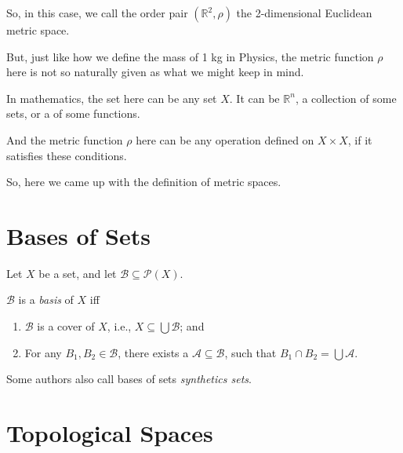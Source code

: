 \documentclass{report}
\begin{document}
So, in this case, we call the order pair $(\mathbb R^2, \rho)$ the 2-dimensional Euclidean metric space.

But, just like how we define the mass of 1 kg in Physics, the metric function $\rho$ here is not so naturally given as what we might keep in mind.

In mathematics, the set here can be any set $X$. It can be $\mathbb R^n$, a collection of some sets, or a of some functions.

And the metric function $\rho$ here can be any operation defined on $X \times X$, if it satisfies these conditions.

So, here we came up with the definition of metric spaces.


\begin{definition}
	
\end{definition}





\section{Bases of Sets}


\begin{definition}
	\label{def: bases of sets}
	Let $X$ be a set, and let $\mathcal B \subseteq \mathcal P(X)$.
	
	$\mathcal B$ is a \textit{basis} of $X$ iff
	\begin{enumerate}
		\item 
		$\mathcal B$ is a cover of $X$, i.e., $X \subseteq \bigcup \mathcal B$; and
		
		\item
		For any $B_1, B_2 \in \mathcal B$, there exists a $\mathcal A \subseteq \mathcal B$, such that $B_1 \cap B_2 = \bigcup \mathcal A$.
	\end{enumerate}
\end{definition}


\begin{note}
	Some authors also call bases of sets \textit{synthetics sets}.
\end{note}



\section{Topological Spaces}
\end{document}
